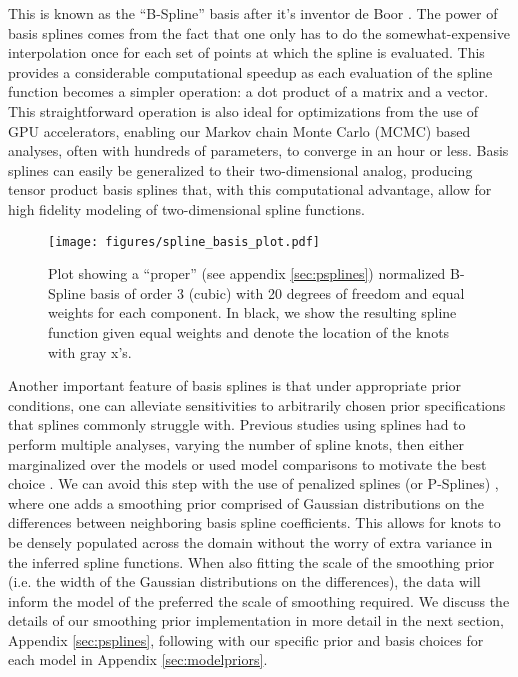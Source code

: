 \noindent This is known as the ``B-Spline'' basis after it's inventor de Boor \citep{deBoor78}. The power of basis splines
comes from the fact that one only has to do the somewhat-expensive interpolation once for each set of points at which the spline is evaluated. 
This provides a considerable computational speedup as each evaluation of the spline function becomes a simpler operation: a dot product of a 
matrix and a vector. This straightforward operation is also ideal for optimizations from the use of GPU accelerators, 
enabling our Markov chain Monte Carlo (MCMC) based analyses, often with hundreds of parameters, to converge in an hour or less. 
Basis splines can easily be generalized to their two-dimensional analog, producing tensor product basis splines that, 
with this computational advantage, allow for high fidelity modeling of two-dimensional spline functions.

\begin{figure}[ht!]
    \begin{centering}
        \texttt{[image: figures/spline\_basis\_plot.pdf]}
        \caption{Plot showing a ``proper'' (see appendix \ref{sec:psplines}) normalized B-Spline basis of order 3 (cubic) with 20 degrees of freedom and equal weights for each component. 
        In black, we show the resulting spline function given equal weights and denote the location of the knots with gray x's. \LinkExplainer}
        \label{fig:spline_basis}
    \end{centering}
\end{figure}

Another important feature of basis splines is that under appropriate prior conditions, one can alleviate sensitivities to arbitrarily 
chosen prior specifications that splines commonly struggle with. Previous studies using splines had to perform multiple analyses, varying the 
number of spline knots, then either marginalized over the models or used model comparisons to motivate the best choice \citep{Edelman_2022ApJ}. 
We can avoid this step with the use of penalized splines (or P-Splines) \citep{eilers2021practical,BayesianPSplines,Jullion2007RobustSO}, 
where one adds a smoothing prior comprised of Gaussian distributions on the differences between neighboring basis spline coefficients. 
This allows for knots to be densely populated across the domain without the worry of extra variance in the inferred spline functions. 
When also fitting the scale of the smoothing prior (i.e. the width of the Gaussian distributions on the differences), the data will inform the model 
of the preferred the scale of smoothing required. We discuss the details of our smoothing prior implementation in more detail in the next section, 
Appendix \ref{sec:psplines}, following with our specific prior and basis choices for each model in Appendix \ref{sec:modelpriors}.

